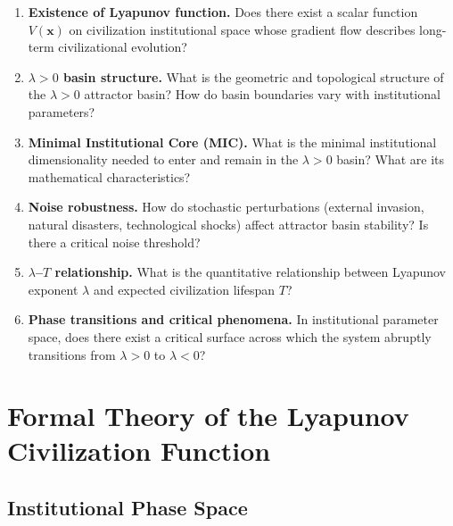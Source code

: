\documentclass[12pt,a4paper]{article}
\theoremstyle{definition}
\newcommand{\lb}{\lambda}
\newcommand{\Lyap}{V}
\begin{document}
\begin{enumerate}[label=\textbf{Q\arabic*}, leftmargin=*]
    \item \textbf{Existence of Lyapunov function.} Does there exist a scalar function $\Lyap(\mathbf{x})$ on civilization institutional space whose gradient flow describes long-term civilizational evolution?
    \item \textbf{$\lb>0$ basin structure.} What is the geometric and topological structure of the $\lb>0$ attractor basin? How do basin boundaries vary with institutional parameters?
    \item \textbf{Minimal Institutional Core (MIC).} What is the minimal institutional dimensionality needed to enter and remain in the $\lb>0$ basin? What are its mathematical characteristics?
    \item \textbf{Noise robustness.} How do stochastic perturbations (external invasion, natural disasters, technological shocks) affect attractor basin stability? Is there a critical noise threshold?
    \item \textbf{$\lb$--$T$ relationship.} What is the quantitative relationship between Lyapunov exponent $\lb$ and expected civilization lifespan $T$?
    \item \textbf{Phase transitions and critical phenomena.} In institutional parameter space, does there exist a critical surface across which the system abruptly transitions from $\lb>0$ to $\lb<0$?
\end{enumerate}

\section{Formal Theory of the Lyapunov Civilization Function}
\label{sec:lyapunov}

\subsection{Institutional Phase Space}
\label{sec:phase_space}
\end{document}

